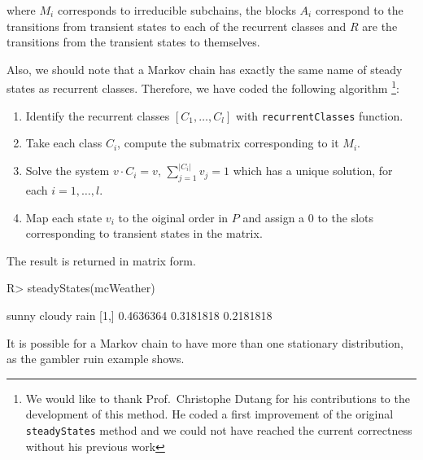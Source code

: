 \documentclass[
  nojss]{jss}
\providecommand{\tightlist}{%
  \setlength{\itemsep}{0pt}\setlength{\parskip}{0pt}}
\begin{document}
where \(M_i\) corresponds to irreducible subchains, the blocks \(A_i\) correspond to the transitions from transient states to each of the recurrent classes and \(R\) are the transitions from the transient states to themselves.

Also, we should note that a Markov chain has exactly the same name of steady states as recurrent classes. Therefore, we have coded the following algorithm \footnote{We would like to thank Prof.~Christophe Dutang for his contributions to the development of this method. He coded a first improvement of the original \texttt{steadyStates} method and we could not have reached the current correctness without his previous work}:

\begin{enumerate}
\def\labelenumi{\arabic{enumi}.}
\tightlist
\item
  Identify the recurrent classes \([C_1, \ldots, C_l]\) with \texttt{recurrentClasses} function.
\item
  Take each class \(C_i\), compute the submatrix corresponding to it \(M_i\).
\item
  Solve the system \(v \cdot C_i = v, \, \sum_{j = 1}^{|C_i|} v_j = 1\) which has a unique solution, for each \(i = 1, \ldots, l\).
\item
  Map each state \(v_i\) to the oiginal order in \(P\) and assign a \(0\) to the slots corresponding to transient states in the matrix.
\end{enumerate}

The result is returned in matrix form.

\begin{CodeChunk}

\begin{CodeInput}
R> steadyStates(mcWeather)
\end{CodeInput}

\begin{CodeOutput}
         sunny    cloudy      rain
[1,] 0.4636364 0.3181818 0.2181818
\end{CodeOutput}
\end{CodeChunk}

It is possible for a Markov chain to have more than one stationary distribution, as the gambler ruin example shows.
\end{document}

